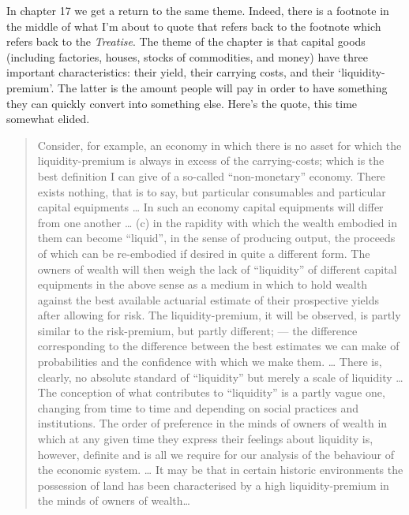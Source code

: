 \documentclass[
  11pt,
  letterpaper,
  DIV=11,
  numbers=noendperiod,
  oneside]{scrartcl}
\begin{document}
In chapter 17 we get a return to the same theme. Indeed, there is a
footnote in the middle of what I'm about to quote that refers back to
the footnote which refers back to the \emph{Treatise}. The theme of the
chapter is that capital goods (including factories, houses, stocks of
commodities, and money) have three important characteristics: their
yield, their carrying costs, and their `liquidity-premium'. The latter
is the amount people will pay in order to have something they can
quickly convert into something else. Here's the quote, this time
somewhat elided.

\begin{quote}
Consider, for example, an economy in which there is no asset for which
the liquidity-premium is always in excess of the carrying-costs; which
is the best definition I can give of a so-called ``non-monetary''
economy. There exists nothing, that is to say, but particular
consumables and particular capital equipments \ldots{} In such an
economy capital equipments will differ from one another \ldots{} (c) in
the rapidity with which the wealth embodied in them can become
``liquid'', in the sense of producing output, the proceeds of which can
be re-embodied if desired in quite a different form. The owners of
wealth will then weigh the lack of ``liquidity'' of different capital
equipments in the above sense as a medium in which to hold wealth
against the best available actuarial estimate of their prospective
yields after allowing for risk. The liquidity-premium, it will be
observed, is partly similar to the risk-premium, but partly different;
--- the difference corresponding to the difference between the best
estimates we can make of probabilities and the confidence with which we
make them. \ldots{} There is, clearly, no
absolute standard of ``liquidity'' but merely a scale of liquidity
\ldots{} The conception of what contributes to ``liquidity'' is a partly
vague one, changing from time to time and depending on social practices
and institutions. The order of preference in the minds
of owners of wealth in which at any given time they express their
feelings about liquidity is, however, definite and is all we require for
our analysis of the behaviour of the economic system. \ldots{} It may be
that in certain historic environments the possession of land has been
characterised by a high liquidity-premium in the minds of owners of
wealth\ldots{}
\end{quote}
\end{document}

